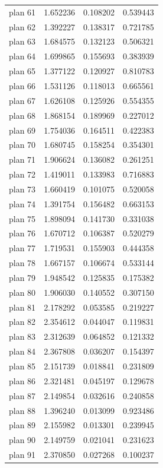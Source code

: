 \begin{table}[h!]
\begin{tabular}{lccc}
plan 61 & 1.652236 & 0.108202 & 0.539443 \\
plan 62 & 1.392227 & 0.138317 & 0.721785 \\
plan 63 & 1.684575 & 0.132123 & 0.506321 \\
plan 64 & 1.699865 & 0.155693 & 0.383939 \\
plan 65 & 1.377122 & 0.120927 & 0.810783 \\
plan 66 & 1.531126 & 0.118013 & 0.665561 \\
plan 67 & 1.626108 & 0.125926 & 0.554355 \\
plan 68 & 1.868154 & 0.189969 & 0.227012 \\
plan 69 & 1.754036 & 0.164511 & 0.422383 \\
plan 70 & 1.680745 & 0.158254 & 0.354301 \\
plan 71 & 1.906624 & 0.136082 & 0.261251 \\
plan 72 & 1.419011 & 0.133983 & 0.716883 \\
plan 73 & 1.660419 & 0.101075 & 0.520058 \\
plan 74 & 1.391754 & 0.156482 & 0.663153 \\
plan 75 & 1.898094 & 0.141730 & 0.331038 \\
plan 76 & 1.670712 & 0.106387 & 0.520279 \\
plan 77 & 1.719531 & 0.155903 & 0.444358 \\
plan 78 & 1.667157 & 0.106674 & 0.533144 \\
plan 79 & 1.948542 & 0.125835 & 0.175382 \\
plan 80 & 1.906030 & 0.140552 & 0.307150 \\
plan 81 & 2.178292 & 0.053585 & 0.219227 \\
plan 82 & 2.354612 & 0.044047 & 0.119831 \\
plan 83 & 2.312639 & 0.064852 & 0.121332 \\
plan 84 & 2.367808 & 0.036207 & 0.154397 \\
plan 85 & 2.151739 & 0.018841 & 0.231809 \\
plan 86 & 2.321481 & 0.045197 & 0.129678 \\
plan 87 & 2.149854 & 0.032616 & 0.240858 \\
plan 88 & 1.396240 & 0.013099 & 0.923486 \\
plan 89 & 2.155982 & 0.013301 & 0.239945 \\
plan 90 & 2.149759 & 0.021041 & 0.231623 \\
plan 91 & 2.370850 & 0.027268 & 0.100237 \\

\end{tabular}
\end{table}
